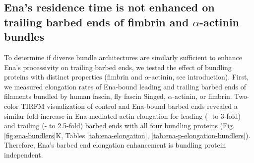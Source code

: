 \begin{figure}[!htb]
\end{figure}

\subsection{Ena's residence time is not enhanced on trailing barbed ends of fimbrin and \texorpdfstring{$\alpha$}{a}-actinin bundles}\label{ena-processive-fimbrin-aact}

To determine if diverse bundle architectures are similarly sufficient to enhance Ena's processivity on trailing barbed ends, we tested the effect of bundling proteins with distinct properties (fimbrin and $\alpha$-actinin, see introduction). First, we measured elongation rates of Ena-bound leading and trailing barbed ends of filaments bundled by human fascin, fly fascin Singed, $\alpha$-actinin, or fimbrin. Two-color TIRFM visualization of control and Ena-bound barbed ends revealed a similar fold increase in Ena-mediated actin elongation for leading (- to 3-fold) and trailing (- to 2.5-fold) barbed ends with all four bundling proteins (Fig. \ref{fig:ena-bundlers}K, Tables \ref{tab:ena-elongation}, \ref{tab:ena-p-elongation-bundlers}). Therefore, Ena's barbed end elongation enhancement is bundling protein independent. 

